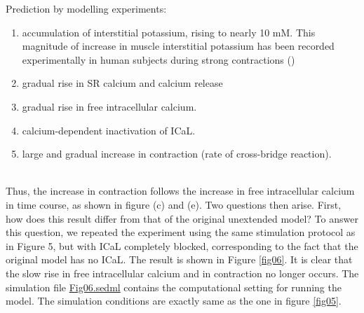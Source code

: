 \documentclass[fleqn,10pt]{physiome}
\begin{document}
Prediction by modelling experiments:
\renewcommand{\labelenumi}{(\alph{enumi})}
\begin{enumerate}
     \item accumulation of interstitial potassium, rising to nearly 10 mM. This magnitude of increase in muscle interstitial potassium has been recorded experimentally in human subjects during strong contractions (\citep{green2000interstitial}) 
     \item gradual rise in SR calcium and calcium release
     \item gradual rise in free intracellular calcium.
     \item calcium-dependent inactivation of ICaL.
     \item large and gradual increase in contraction (rate of cross-bridge reaction).
\end{enumerate}\\ 
Thus, the increase in contraction follows the increase in free intracellular calcium in time course, as shown in figure (c) and (e). Two questions then arise. First, how does this result differ from that of the original unextended model? To answer this question, we repeated the experiment using the same stimulation protocol as in Figure 5, but with ICaL completely blocked, corresponding to the fact that the original \citep{shorten2007mathematical} model has no ICaL.  The result is shown in Figure \ref{fig06}. It is clear that the slow rise in free intracellular calcium and in contraction no longer occurs. The simulation file \href{http://models.cellml.org/workspace/5f4/file/4071d5b4ec40c5e2b845a7a75e942df1966d2ba2/Fig06.sedml}{Fig06.sedml} contains the computational setting for running the model. The simulation conditions are exactly same as the one in figure \ref{fig05}.
\end{document}
